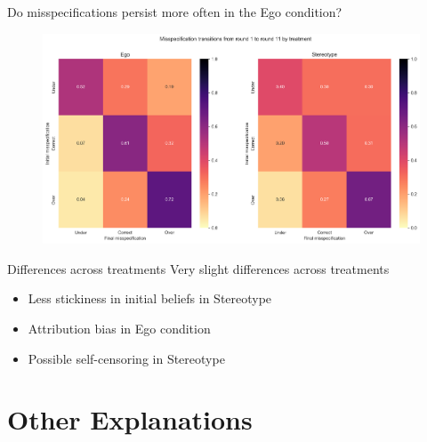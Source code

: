 \documentclass[aspectratio=169]{beamer}
\begin{document}
\begin{frame}{Do misspecifications persist more often in the Ego condition?}

        \begin{figure}
            \centering
            \includegraphics[scale=.4]{misspecification_transitions_treatment.png}
        \end{figure}
\end{frame}


\begin{frame}{Differences across treatments}
    Very slight differences across treatments\\
    \begin{itemize}
        \item Less stickiness in initial beliefs in Stereotype
        \item Attribution bias in Ego condition
        \item Possible self-censoring in Stereotype
    \end{itemize}


\end{frame}

\section*{Other Explanations}
\end{document}

